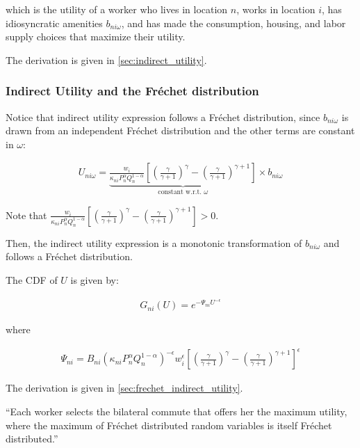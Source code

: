 \documentclass[10pt]{article}
\begin{document}
which is the utility of a worker who lives in location $n$,
works in location $i$, has idiosyncratic amenities $b_{n i \omega}$,
and has made the consumption, housing, and labor supply choices that
maximize their utility.

The derivation is given in \autoref{sec:indirect_utility}.

\subsubsection{Indirect Utility and the Fréchet distribution}

Notice that indirect utility expression follows a Fréchet distribution,
since $b_{n i \omega}$ is drawn from an independent Fréchet distribution
and the other terms are constant in $\omega$:

\begin{align}
    U_{n i \omega}=\underbrace{\frac{w_i}{\kappa_{n i} P_n^\alpha Q_n^{1-\alpha}} \left[\left(\frac{\gamma}{\gamma+1}\right)^\gamma-\left(\frac{\gamma}{\gamma+1}\right)^{\gamma+1}\right]}_{\text {constant w.r.t. } \omega} \times b_{n i \omega}
\end{align}

Note that $\frac{w_i}{\kappa_{n i} P_n^\alpha Q_n^{1-\alpha}} \left[\left(\frac{\gamma}{\gamma+1}\right)^\gamma-\left(\frac{\gamma}{\gamma+1}\right)^{\gamma+1}\right] > 0$.

Then, the indirect utility expression is a monotonic 
transformation of $b_{n i \omega}$ and 
follows a Fréchet distribution.

The CDF of $U$ is given by:

\begin{align}
    G_{n i}(U)=e^{-\Psi_{n i} U^{-\epsilon}} \label{eq:frechet_indirect_utility}
\end{align}

where 

\begin{align}
    \Psi_{n i}=B_{n i}\left(\kappa_{n i} P_n^\alpha Q_n^{1-\alpha}\right)^{-\epsilon} w_i^\epsilon \left[\left(\frac{\gamma}{\gamma+1}\right)^\gamma-\left(\frac{\gamma}{\gamma+1}\right)^{\gamma+1}\right]^\epsilon
\end{align}

The derivation is given in \autoref{sec:frechet_indirect_utility}.

``Each worker selects the
bilateral commute that offers her the maximum utility, where the maximum of
Fréchet distributed random variables is itself Fréchet distributed.''
\end{document}
